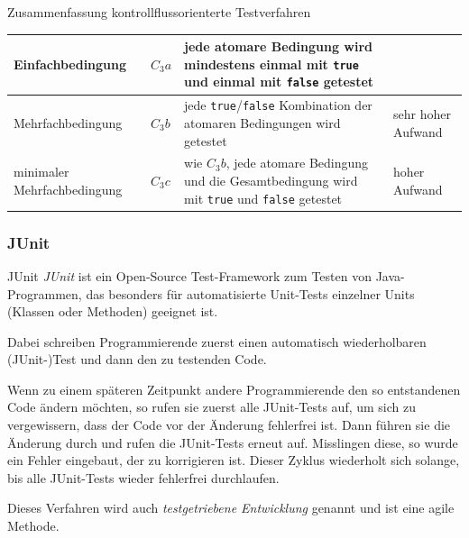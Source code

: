 \begin{bonus}{Zusammenfassung kontrollflussorienterte Testverfahren}
\begin{tabularx}{\textwidth}{|p{4.1cm}|l|X|X|}
        Einfachbedingung                      & $C_3a$           & jede atomare Bedingung wird mindestens einmal mit \texttt{true} und einmal mit \texttt{false} getestet        &                                                       \\
        \hline
        Mehrfachbedingung                     & $C_3b$           & jede \texttt{true}/\texttt{false} Kombination der atomaren Bedingungen wird getestet                          & sehr hoher Aufwand                                    \\
        \hline
        minimaler Mehrfachbedingung           & $C_3c$           & wie $C_3b$, jede atomare Bedingung und die Gesamtbedingung wird mit \texttt{true} und \texttt{false} getestet & hoher Aufwand                                         \\
        \hline
    \end{tabularx}
\end{bonus}

\subsubsection{JUnit}

\begin{bonus}{JUnit}
    \emph{JUnit} ist ein Open-Source Test-Framework zum Testen von Java-Programmen, das besonders für automatisierte Unit-Tests einzelner Units (Klassen oder Methoden) geeignet ist.

    Dabei schreiben Programmierende zuerst einen automatisch wiederholbaren (JUnit-)Test und dann den zu testenden Code.

    Wenn zu einem späteren Zeitpunkt andere Programmierende den so entstandenen Code ändern möchten, so rufen sie zuerst alle JUnit-Tests auf, um sich zu vergewissern, dass der Code vor der Änderung fehlerfrei ist.
    Dann führen sie die Änderung durch und rufen die JUnit-Tests erneut auf.
    Misslingen diese, so wurde ein Fehler eingebaut, der zu korrigieren ist.
    Dieser Zyklus wiederholt sich solange, bis alle JUnit-Tests wieder fehlerfrei durchlaufen.

    Dieses Verfahren wird auch \emph{testgetriebene Entwicklung} genannt und ist eine agile Methode.
\end{bonus}

